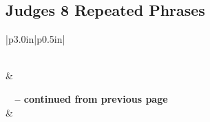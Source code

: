 \subsection{Judges 8 Repeated Phrases}


\normalsize
 
\begin{center}
\begin{longtable}{|p{3.0in}|p{0.5in}|}
\caption[Judges 8 Repeated Phrases]{Judges 8 Repeated Phrases}\label{table:Repeated Phrases Judges 8} \\
\hline {} &  \\ \hline 
\endfirsthead
 
{{\bfseries \tablename\ \thetable{} -- continued from previous page}} \\  
\hline {} &  \\ \hline 
\endhead
 

\end{longtable}
\end{center}
